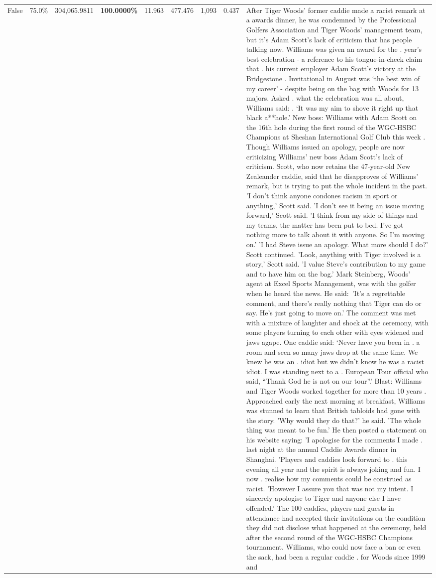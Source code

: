 \begin{table}[H]
\begin{tabular}{lllrlllll}
False & 75.0\% & 304,065.9811 & \bfseries \color{red} 100.0000\% & 11.963 & 477.476 & 1,093 & 0.437 & After Tiger Woods' former caddie made a racist remark at a awards dinner, he was condemned by the Professional Golfers Association and Tiger Woods' management team, but it's Adam Scott's lack of criticism that has people talking now. Williams was given an award for the . year’s best celebration - a reference to his tongue-in-cheek claim that . his current employer Adam Scott’s victory at the Bridgestone . Invitational in August was ‘the best win of my career’ - despite being on the bag with Woods for 13 majors. Asked . what the celebration was all about, Williams said: . ‘It was my aim to shove it right up that black a**hole.’ New boss: Williams with Adam Scott  on the 16th hole during the first round of the WGC-HSBC Champions at Sheshan International Golf Club this week . Though Williams issued an apology, people are now criticizing Williams' new boss Adam Scott's lack of criticism. Scott, who now retains the 47-year-old New Zealeander caddie, said that he disapproves of Williams' remark, but is trying to put the whole incident in the past. 'I don't think anyone condones racism in sport or anything,' Scott said. 'I don't see it being an issue moving forward,' Scott said. 'I think from my side of things and my teams, the matter has been put to bed. I've got nothing more to talk about it with anyone. So I'm moving on.' 'I had Steve issue an apology. What more should I do?' Scott continued. 'Look, anything with Tiger involved is a story,' Scott said. 'I value Steve's contribution to my game and to have him on the bag.' Mark Steinberg, Woods' agent at Excel Sports Management, was with the golfer when he heard the news. He said: 'It's a regrettable comment, and there's really nothing that Tiger can do or say. He's just going to move on.' The comment was met with a mixture of laughter and shock at the ceremony, with some players turning to each other with eyes widened and jaws agape. One caddie said: ‘Never have you been in . a room and seen so many jaws drop at the same time. We knew he was an . idiot but we didn’t know he was a racist idiot. I was standing next to a . European Tour official who said, “Thank God he is not on our tour”.’ Blast: Williams and Tiger Woods worked together for more than 10 years . Approached early the next morning at breakfast, Williams was stunned to learn that British tabloids had gone with the story. 'Why would they do that?' he said. 'The whole thing was meant to be fun.' He then posted a statement on his website saying: 'I apologise for the comments I made . last night at the annual Caddie Awards dinner in Shanghai. 'Players and caddies look forward to . this evening all year and the spirit is always joking and fun. I now . realise how my comments could be construed as racist. 'However I assure you that was not my intent. I sincerely apologise to Tiger and anyone else I have offended.' The 100 caddies, players and guests in attendance had accepted their invitations on the condition they did not disclose what happened at the ceremony, held after the second round of the WGC-HSBC Champions tournament. Williams, who could now face a ban or even the sack, had been a regular caddie . for Woods since 1999 and 
\end{tabular}
\end{table}
